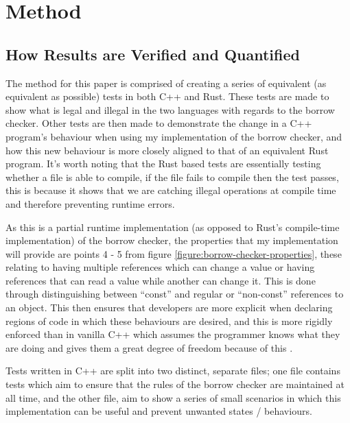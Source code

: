 \documentclass[a4paper]{article}
\begin{document}

\section{Method}\label{section:method}
\subsection{How Results are Verified and Quantified}
The method for this paper is comprised of creating a series of equivalent (as equivalent as possible) tests in both C++ and Rust. These tests are made to show what is legal and illegal in the two languages with regards to the borrow checker. Other tests are then made to demonstrate the change in a C++ program's behaviour when using my implementation of the borrow checker, and how this new behaviour is more closely aligned to that of an equivalent Rust program. It's worth noting that the Rust based tests are essentially testing whether a file is able to compile, if the file fails to compile then the test passes, this is because it shows that we are catching illegal operations at compile time and therefore preventing runtime errors.

As this is a partial runtime implementation (as opposed to Rust's compile-time implementation) of the borrow checker, the properties that my implementation will provide are points 4 - 5 from figure \ref{figure:borrow-checker-properties}, these relating to having multiple references which can change a value or having references that can read a value while another can change it. This is done through distinguishing between ``const'' and regular or ``non-const'' references to an object. This then ensures that developers are more explicit when declaring regions of code in which these behaviours are desired, and this is more rigidly enforced than in vanilla C++ which assumes the programmer knows what they are doing and gives them a great degree of freedom because of this \parencite{cpp-core-guidelines-talk}.

Tests written in C++ are split into two distinct, separate files; one file  contains tests which aim to ensure that the rules of the borrow checker are maintained at all time, and the other file,  aim to show a series of small scenarios in which this implementation can be useful and prevent unwanted states / behaviours.
\end{document}
